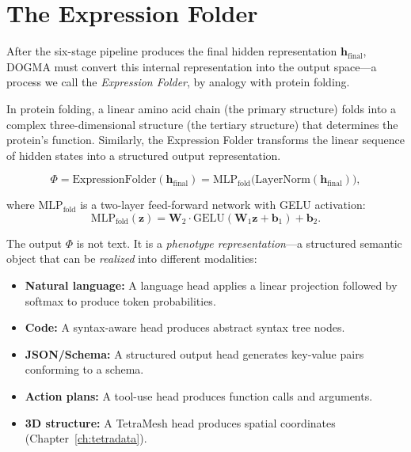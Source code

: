 \section{The Expression Folder}
\label{sec:expression-folder}

After the six-stage pipeline produces the final hidden representation $\mathbf{h}_{\text{final}}$, DOGMA must convert this internal representation into the output space---a process we call the \emph{Expression Folder}, by analogy with protein folding.

In protein folding, a linear amino acid chain (the primary structure) folds into a complex three-dimensional structure (the tertiary structure) that determines the protein's function. Similarly, the Expression Folder transforms the linear sequence of hidden states into a structured output representation.

\begin{equation}
\Phi = \mathrm{ExpressionFolder}(\mathbf{h}_{\text{final}}) = \mathrm{MLP}_{\text{fold}}\bigl(\mathrm{LayerNorm}(\mathbf{h}_{\text{final}})\bigr),
\label{eq:expression-folder}
\end{equation}

where $\mathrm{MLP}_{\text{fold}}$ is a two-layer feed-forward network with GELU activation:
\begin{equation}
\mathrm{MLP}_{\text{fold}}(\mathbf{z}) = \mathbf{W}_2 \cdot \mathrm{GELU}(\mathbf{W}_1 \mathbf{z} + \mathbf{b}_1) + \mathbf{b}_2.
\label{eq:fold-mlp}
\end{equation}

The output $\Phi$ is not text. It is a \emph{phenotype representation}---a structured semantic object that can be \emph{realized} into different modalities:
\begin{itemize}[leftmargin=1.5em]
  \item \textbf{Natural language:} A language head applies a linear projection followed by softmax to produce token probabilities.
  \item \textbf{Code:} A syntax-aware head produces abstract syntax tree nodes.
  \item \textbf{JSON/Schema:} A structured output head generates key-value pairs conforming to a schema.
  \item \textbf{Action plans:} A tool-use head produces function calls and arguments.
  \item \textbf{3D structure:} A TetraMesh head produces spatial coordinates (Chapter~\ref{ch:tetradata}).
\end{itemize}

